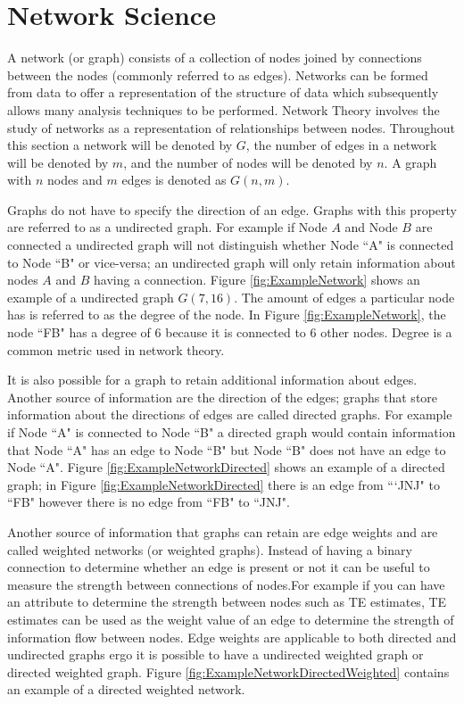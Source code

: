 
\section{Network Science} \label{sec:NetworkScience}


A network (or graph) consists of a collection of nodes joined by connections between the nodes (commonly referred to as edges). Networks can be formed from data to offer a representation of the structure of data which subsequently allows many analysis techniques to be performed. Network Theory involves the study of networks as a representation of relationships between nodes. Throughout this section a network will be denoted by \(G\), the number of edges in a network will be denoted by \(m\), and the number of nodes will be denoted by \(n\).  A graph with \(n\) nodes and \(m\) edges is denoted as \(G(n,m)\).

Graphs do not have to specify the direction of an edge. Graphs with this property are referred to as a undirected graph. For example if Node \(A\) and Node \(B\) are connected a undirected graph will not distinguish whether Node ``A" is connected to Node ``B" or vice-versa;  an undirected graph will only retain information about nodes \(A\) and \(B\) having a connection. Figure \ref{fig:ExampleNetwork} shows an example of a undirected graph \(G(7,16)\). The amount of edges a particular node has is referred to as the degree of the node. In Figure \ref{fig:ExampleNetwork}, the node ``FB" has a degree of 6 because it is connected to 6 other nodes.
Degree is a common metric used in network theory.

It is also possible for a graph to retain additional information about edges. Another source of information are the direction of the edges; graphs that store information about the directions of edges are called directed graphs. For example if Node ``A"  is connected to Node ``B" a directed graph would contain information that Node ``A"  has an edge to Node ``B" but Node ``B" does not have an edge to Node ``A". Figure \ref{fig:ExampleNetworkDirected} shows an example of a directed graph; in Figure \ref{fig:ExampleNetworkDirected} there is an edge from ```JNJ" to ``FB"  however there is no edge from ``FB" to ``JNJ".

Another source of information that graphs can retain are edge weights and are called weighted networks (or weighted graphs). Instead of having a binary connection to determine whether an edge is present or not it can be useful to measure the strength between connections of nodes.For example if you can have an attribute to determine the strength between nodes such as TE estimates, TE estimates can be used as the weight value of an edge to determine the strength of information flow between nodes. Edge weights are applicable to both directed and undirected graphs ergo it is possible to have a undirected weighted graph or directed weighted graph. Figure \ref{fig:ExampleNetworkDirectedWeighted} contains an example of a directed weighted network. 

